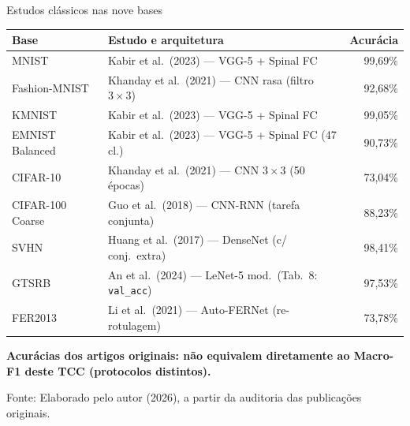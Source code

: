 \documentclass[aspectratio=169,11pt,brazil]{beamer}
\newcommand{\fonte}[1]{\par\vfill{\footnotesize\color{textmuted}Fonte: #1\par}}
\begin{document}
\begin{frame}{Estudos clássicos nas nove bases}
  \centering
  {\footnotesize
  \begin{tabular}{@{}llr@{}}
    \toprule
    \textbf{Base} & \textbf{Estudo e arquitetura} & \textbf{Acurácia} \\
    \midrule
    MNIST & Kabir et al.\ (2023) --- VGG-5 + Spinal FC & 99,69\% \\
    Fashion-MNIST & Khanday et al.\ (2021) --- CNN rasa (filtro $3\times 3$) & 92,68\% \\
    KMNIST & Kabir et al.\ (2023) --- VGG-5 + Spinal FC & 99,05\% \\
    EMNIST Balanced & Kabir et al.\ (2023) --- VGG-5 + Spinal FC (47 cl.) & 90,73\% \\
    CIFAR-10 & Khanday et al.\ (2021) --- CNN $3\times 3$ (50 épocas) & 73,04\% \\
    CIFAR-100 Coarse & Guo et al.\ (2018) --- CNN-RNN (tarefa conjunta) & 88,23\% \\
    SVHN & Huang et al.\ (2017) --- DenseNet (c/ conj.\ extra) & 98,41\% \\
    GTSRB & An et al.\ (2024) --- LeNet-5 mod.\ (Tab.\ 8: \texttt{val\_acc}) & 97,53\% \\
    FER2013 & Li et al.\ (2021) --- Auto-FERNet (re-rotulagem) & 73,78\% \\
    \bottomrule
  \end{tabular}}
  \vspace{0.15cm}
  {\footnotesize\bfseries\color{senacblue}Acurácias dos artigos originais: não equivalem diretamente ao Macro-F1 deste TCC (protocolos distintos).}
  \fonte{Elaborado pelo autor (2026), a partir da auditoria das publicações originais.}
\end{frame}
\end{document}

